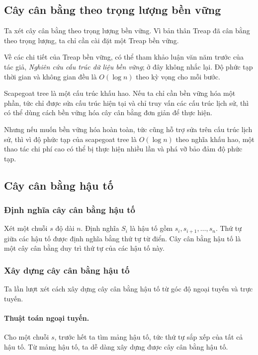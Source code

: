 \documentclass[11pt]{article}
\begin{document}
\subsection{Cây cân bằng theo trọng lượng bền vững}

Ta xét cây cân bằng theo trọng lượng bền vững. Vì bản thân Treap đã cân bằng
theo trọng lượng, ta chỉ cần cài đặt một Treap bền vững.

Về các chi tiết của Treap bền vững, có thể tham khảo luận văn năm trước của
tác giả, \emph{Nghiên cứu cấu trúc dữ liệu bền vững}; ở đây không nhắc lại.
Độ phức tạp thời gian và không gian đều là \(O(\log n)\) theo kỳ vọng cho
mỗi bước.

Scapegoat tree là một cấu trúc khấu hao. Nếu ta chỉ cần bền vững hóa một
phần, tức chỉ được sửa cấu trúc hiện tại và chỉ truy vấn các cấu trúc lịch
sử, thì có thể dùng cách bền vững hóa cây cân bằng đơn giản để thực hiện.

Nhưng nếu muốn bền vững hóa hoàn toàn, tức cũng hỗ trợ sửa trên cấu trúc
lịch sử, thì vì độ phức tạp của scapegoat tree là \(O(\log n)\) theo nghĩa
khấu hao, một thao tác chi phí cao có thể bị thực hiện nhiều lần và phá vỡ
bảo đảm độ phức tạp.

\subsection{Cây cân bằng hậu tố}

\subsubsection{Định nghĩa cây cân bằng hậu tố}

Xét một chuỗi \(s\) độ dài \(n\). Định nghĩa \(S_i\) là hậu tố gồm
\(s_i,s_{i+1},\ldots,s_n\). Thứ tự giữa các hậu tố được định nghĩa bằng thứ
tự từ điển. Cây cân bằng hậu tố là một cây cân bằng duy trì thứ tự của các
hậu tố này.

\subsubsection{Xây dựng cây cân bằng hậu tố}

Ta lần lượt xét cách xây dựng cây cân bằng hậu tố từ góc độ ngoại tuyến và
trực tuyến.

\paragraph{Thuật toán ngoại tuyến.}
Cho một chuỗi \(s\), trước hết ta tìm mảng hậu tố, tức thứ tự sắp xếp của
tất cả hậu tố. Từ mảng hậu tố, ta dễ dàng xây dựng được cây cân bằng hậu tố.
\end{document}
